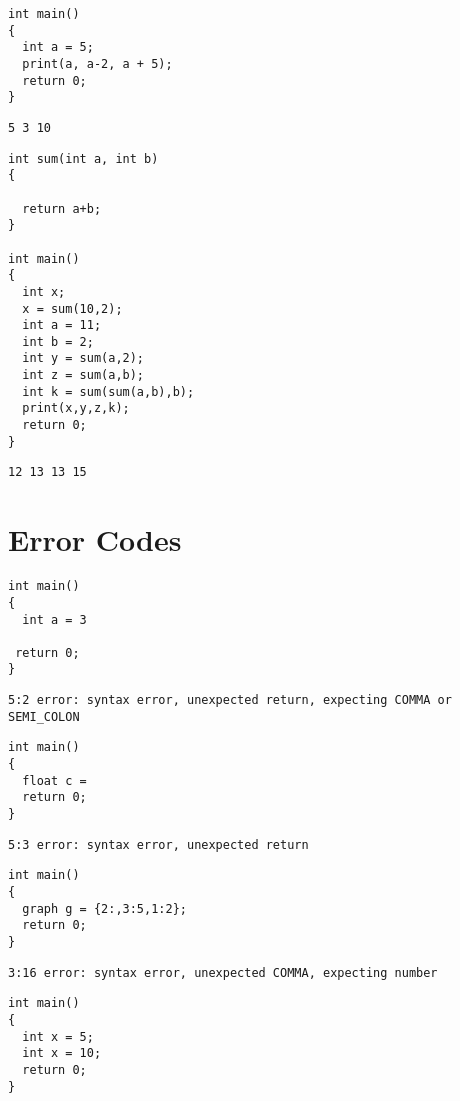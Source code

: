\documentclass[english,a4paper,12pt]{report}
\begin{document}
\begin{lstlisting}[style=CStyle]
int main()
{
  int a = 5;
  print(a, a-2, a + 5);
  return 0;
}
\end{lstlisting}

\begin{lstlisting}
5 3 10
\end{lstlisting}

\begin{lstlisting}[style=CStyle]
int sum(int a, int b)
{

  return a+b;
}

int main()
{
  int x;
  x = sum(10,2);
  int a = 11;
  int b = 2;
  int y = sum(a,2);
  int z = sum(a,b);
  int k = sum(sum(a,b),b);
  print(x,y,z,k);
  return 0;
}
\end{lstlisting}

\begin{lstlisting}
12 13 13 15
\end{lstlisting}

\section{Error Codes}
\begin{lstlisting}[style=CStyle]
int main()
{
  int a = 3

 return 0;
}
\end{lstlisting}

\begin{lstlisting}
5:2 error: syntax error, unexpected return, expecting COMMA or SEMI_COLON
\end{lstlisting}

\begin{lstlisting}[style=CStyle]
int main()
{
  float c = 
  return 0;
}
\end{lstlisting}

\begin{lstlisting}
5:3 error: syntax error, unexpected return
\end{lstlisting}

\begin{lstlisting}[style=CStyle]
int main()
{
  graph g = {2:,3:5,1:2}; 
  return 0;
}
\end{lstlisting}

\begin{lstlisting}
3:16 error: syntax error, unexpected COMMA, expecting number
\end{lstlisting}

\begin{lstlisting}[style=CStyle]
int main()
{
  int x = 5;
  int x = 10;
  return 0;
}
\end{lstlisting}
\end{document}

